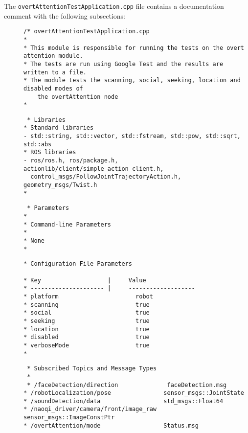 \documentclass{CSSRforAfrica}
\newcommand{\checkboxChecked}{\fbox{\ding{51}}} %
\begin{document}
\noindent The {\small \verb+overtAttentionTestApplication.cpp+} file contains a documentation comment with the following subsections:

\begin{description}

\item[\checkboxChecked] 
 {\small 
\begin{verbatim}
/* overtAttentionTestApplication.cpp
*
* This module is responsible for running the tests on the overt attention module.
* The tests are run using Google Test and the results are written to a file. 
* The module tests the scanning, social, seeking, location and disabled modes of 
    the overtAttention node
*
\end{verbatim}}

\item[\checkboxChecked] 
 {\small 
\begin{verbatim}
 * Libraries
* Standard libraries
- std::string, std::vector, std::fstream, std::pow, std::sqrt, std::abs
* ROS libraries
- ros/ros.h, ros/package.h, actionlib/client/simple_action_client.h, 
  control_msgs/FollowJointTrajectoryAction.h, geometry_msgs/Twist.h
*
\end{verbatim}}

\item[\checkboxChecked] 
 {\small 
\begin{verbatim}
 * Parameters
*
* Command-line Parameters
*
* None
*
\end{verbatim}}

\item[\checkboxChecked] 
 {\small 
\begin{verbatim}
* Configuration File Parameters

* Key                   |     Value 
* --------------------- |     -------------------
* platform                      robot
* scanning                      true
* social                        true
* seeking                       true
* location                      true
* disabled                      true
* verboseMode                   true
*
\end{verbatim}}

\item[\checkboxChecked] 
 {\small 
\begin{verbatim}
 * Subscribed Topics and Message Types
 *
 * /faceDetection/direction              faceDetection.msg     
* /robotLocalization/pose               sensor_msgs::JointState
* /soundDetection/data                  std_msgs::Float64    
* /naoqi_driver/camera/front/image_raw  sensor_msgs::ImageConstPtr     
* /overtAttention/mode                  Status.msg  
\end{verbatim}}


\end{description}
\end{document}
